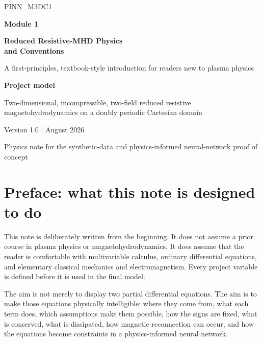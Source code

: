 \documentclass[11pt]{article}
\begin{document}
\hypersetup{pageanchor=false}

\begin{titlepage}
\centering
\vspace*{1.2cm}
{\Large\color{AccentTeal} PINN\_M3DC1}\par
\vspace{0.7cm}
{\Huge\bfseries\color{TitleBlue} Module 1}\par
\vspace{0.25cm}
{\LARGE\bfseries\color{TitleBlue} Reduced Resistive-MHD Physics\\and Conventions}\par
\vspace{0.9cm}
{\large A first-principles, textbook-style introduction for readers new to plasma physics}\par
\vfill
\begin{tcolorbox}[width=0.88\textwidth,colback=SoftBlue,colframe=TitleBlue,arc=2mm]
\centering
\textbf{Project model}\par
\vspace{0.3em}
Two-dimensional, incompressible, two-field reduced resistive magnetohydrodynamics on a doubly periodic Cartesian domain
\end{tcolorbox}
\vfill
{\normalsize Version 1.0 \quad |  August 2026}\par
\vspace{0.25cm}
{\small Physics note for the synthetic-data and physics-informed neural-network proof of concept}\par
\end{titlepage}

\hypersetup{pageanchor=true}

\section*{Preface: what this note is designed to do}

This note is deliberately written from the beginning. It does not assume a prior course in plasma physics or magnetohydrodynamics. It does assume that the reader is comfortable with multivariable calculus, ordinary differential equations, and elementary classical mechanics and electromagnetism. Every project variable is defined before it is used in the final model.

The aim is not merely to display two partial differential equations. The aim is to make those equations physically intelligible: where they come from, what each term does, which assumptions make them possible, how the signs are fixed, what is conserved, what is dissipated, how magnetic reconnection can occur, and how the equations become constraints in a physics-informed neural network.
\end{document}
